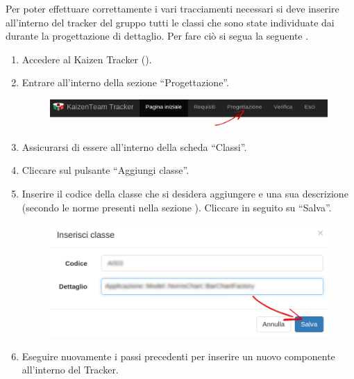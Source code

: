 				 \label{sec:InsClasse}
					Per poter effettuare correttamente i vari tracciamenti necessari si deve inserire all'interno del tracker del gruppo tutti le classi che sono state individuate dai  durante la progettazione di dettaglio. Per fare ciò si segua la seguente .
					\begin{enumerate}
						\item Accedere al Kaizen  Tracker ().
						\item Entrare all'interno della sezione “Progettazione”.
						\begin{figure}[H]
							\centering
							\includegraphics[width=\textwidth]{Pics/HomePageMenuFrecciaProg}
						\end{figure}
						\item Assicurarsi di essere all'interno della scheda “Classi”.
						\item Cliccare sul pulsante “Aggiungi classe”.
						\item Inserire il codice della classe che si desidera aggiungere e una sua descrizione (secondo le norme presenti nella sezione ). Cliccare in seguito su “Salva”.
						\begin{figure}[H]
							\centering
							\includegraphics[width=\textwidth]{Pics/InserireClasse}
						\end{figure}
						\item Eseguire nuovamente i passi precedenti per inserire un nuovo componente all'interno del Tracker.
					\end{enumerate}

